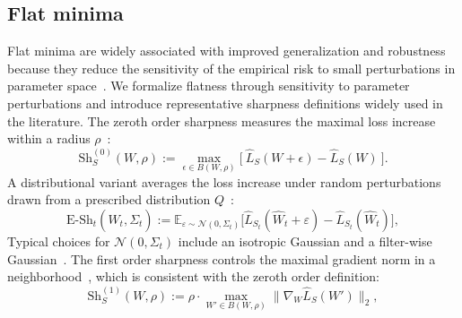 \documentclass{article} %
\begin{document}


\subsection{Flat minima}


 






Flat minima are widely associated with improved generalization and robustness because they reduce the sensitivity of the empirical risk to small perturbations in parameter space~\cite{FlatMinima1997,wu2017understandinggeneralizationdeeplearning,NEURIPS2020_518a38cc,bahri2022sharpnessawareminimizationimproveslanguage,NEURIPS2021_995f5e03,JMLRAnEmpiricalInvestigatio,yangRevisitingFlatnessAwareOptimization2025}.
We formalize flatness through sensitivity to parameter perturbations and introduce representative  sharpness definitions widely used in the literature.
The zeroth order sharpness measures the maximal loss increase within a radius $\rho$~\cite{AWP2020,foretSharpnessAwareMinimizationEfficiently2021}: 
$$\mathrm{Sh}^{(0)}_S(W,\rho) :=\max_{{\epsilon}\in B(W,\rho)} \Big[\ \hat{L}_{S}(W+{\epsilon})-\hat{L}_{S}(W)\ \Big].$$
A distributional variant averages the loss increase under random perturbations drawn from a prescribed distribution $Q$~\cite{liRevisitingRandomWeight2024,jiang2019fantasticgeneralizationmeasures}:
$$\mathrm{E\text{-}Sh}_t(\hat{W}_t, \Sigma_t)
 :=
 \mathbb{E}_{\varepsilon \sim \mathcal{N}(0,\Sigma_t)}
 \big[
 \hat{L}_{S_t}(\hat{W}_t+\varepsilon) - \hat{L}_{S_t}(\hat{W}_t)
 \big],$$
Typical choices for $\mathcal{N}(0,\Sigma_t)$ include an isotropic Gaussian and a filter-wise Gaussian~\cite{pmlr-v151-bisla22a}. The first order sharpness controls the maximal gradient norm in a neighborhood~\cite{Zhang_GAM}, which is consistent with the zeroth order definition:
$$\mathrm{Sh}^{(1)}_S(W,\rho) := \rho\cdot \max_{W'\in B(W,\rho)} \big\|\nabla_{W} \hat{L}_S(W')\big\|_2,$$
\end{document}
